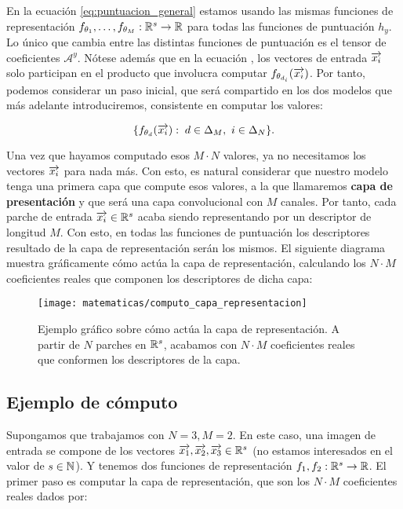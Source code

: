 En la ecuación \eqref{eq:puntuacion_general} estamos usando las mismas funciones de representación $f_{\theta_1}, \ldots, f_{\theta_M}: \mathbb{R}^s \to \mathbb{R}$ para todas las funciones de puntuación $h_y$. Lo único que cambia entre las distintas funciones de puntuación es el tensor de coeficientes $\mathcal{A}^y$. Nótese además que en la ecuación , los vectores de entrada $\overrightarrow{x_i}$ solo participan en el producto que involucra computar $f_{\theta_{d_i}}(\overrightarrow{x_i})$. Por tanto, podemos considerar un paso inicial, que será compartido en los dos modelos que más adelante introduciremos, consistente en computar los valores:

$$\{f_{\theta_d}(\overrightarrow{x_i}): \; d \in \Delta_{M},\ i \in \Delta_{N} \}.$$

Una vez que hayamos computado esos $M \cdot N$ valores, ya no necesitamos los vectores $\overrightarrow{x_i}$ para nada más. Con esto, es natural considerar que nuestro modelo tenga una primera capa que compute esos valores, a la que llamaremos \textbf{capa de presentación} y que será una capa convolucional con $M$ canales. Por tanto, cada parche de entrada $\overrightarrow{x_i} \in \mathbb{R}^s$ acaba siendo representando por un descriptor de longitud $M$. Con esto, en todas las funciones de puntuación los descriptores resultado de la capa de representación serán los mismos. El siguiente diagrama muestra gráficamente cómo actúa la capa de representación, calculando los $N \cdot M$ coeficientes reales que componen los descriptores de dicha capa:

\begin{figure}[!hbtp]
	\centering
	\texttt{[image: matematicas/computo\_capa\_representacion]}
	\caption{Ejemplo gráfico sobre cómo actúa la capa de representación. A partir de $N$ parches en $\mathbb{R}^s$, acabamos con $N \cdot M$ coeficientes reales que conformen los descriptores de la capa.}
\end{figure}


\subsection{Ejemplo de cómputo} \label{ejemplo:funcion_puntuacion}

Supongamos que trabajamos con $N = 3, M = 2$. En este caso, una imagen de entrada se compone de los vectores $\overrightarrow{x_1}, \overrightarrow{x_2}, \overrightarrow{x_3} \in \mathbb{R}^s$ (no estamos interesados en el valor de $s \in \mathbb{N}$). Y tenemos dos funciones de representación $f_1, f_2: \mathbb{R}^s \to \mathbb{R}$. El primer paso es computar la capa de representación, que son los $N \cdot M$ coeficientes reales dados por:


